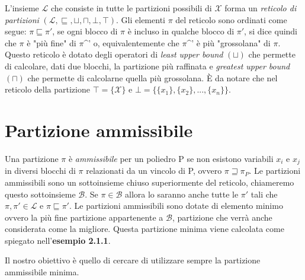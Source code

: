 \documentclass{mimosis}
\theoremstyle{definition}
\begin{document}
L'insieme \(\mathcal{L}\) che consiste in tutte le partizioni possibili di \(\mathcal{X}\)
forma un \emph{reticolo di partizioni} \((\mathcal{L}, \sqsubseteq, \sqcup, \sqcap,
\bot, \top)\). Gli elementi \(\pi\) del reticolo sono ordinati come segue: \(\pi
\sqsubseteq \pi'\), se ogni blocco di \(\pi\) è incluso in qualche blocco di
\(\pi'\), si dice quindi che \(\pi\) è "più fine" di \(\pi\)\^{}' o, equivalentemente che
\(\pi\)\^{}' è più "grossolana" di \(\pi\). Questo reticolo è dotato degli operatori di \emph{least upper bound}
\((\sqcup)\) che permette di calcolare, dati due blocchi, la partizione più
raffinata e \emph{greatest upper bound} \((\sqcap)\) che permette di calcolarne quella
più grossolana. È da notare che nel reticolo della
partizione \(\top = \{\mathcal{X}\}\) e \(\bot = \{\{x_1\}, \{x_2\}, ..., \{x_n\}\}\).

\section{Partizione ammissibile}
\label{sec:orgb05a27f}
Una partizione \(\pi\) è \emph{ammissibile} per un poliedro P se non esistono
variabili \(x_i\) e \(x_j\) in diversi blocchi di \(\pi\) relazionati da un vincolo di
P, ovvero \(\pi \sqsupseteq \pi_P\). Le partizioni ammissibili sono un
sottoinsieme chiuso superiormente del reticolo, chiameremo questo sottoinsieme
\(\mathcal{B}\). Se \(\pi \in \mathcal{B}\) allora lo saranno anche tutte
le \(\pi'\) tali che \(\pi, \pi' \in \mathcal{L}\) e
\(\pi \sqsubseteq \pi'\). Le partizioni ammissibili sono
dotate di elemento minimo ovvero la più fine partizione appartenente a
\(\mathcal{B}\), partizione che verrà anche considerata come la migliore. Questa
partizione minima viene calcolata come spiegato nell'\textbf{esempio 2.1.1}.

Il nostro obiettivo è quello di cercare di utilizzare sempre la partizione
ammissibile minima.
\end{document}
